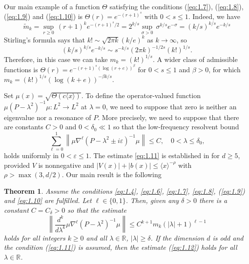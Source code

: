 \documentclass[11pt]{amsart}
\newtheorem{Theorem}{Theorem}[section]
\numberwithin{equation}{section}
\def\R{{\mathbb R}}
\begin{document}
Our main example of a function $\Theta$ satisfying the conditions 
(\ref{eq:1.7}), (\ref{eq:1.8}), (\ref{eq:1.9}) and (\ref{eq:1.10}) is $\Theta(r)=e^{-(r+1)^s}$ with $0<s\le 1$. Indeed, we have
\begin{equation*}
\widetilde m_k=\sup_{r\ge 0}\,(r+1)^{k}e^{-(r+1)^s/2}=2^{k/s}\sup_{\sigma>0}\,\sigma^{k/s}e^{-\sigma}
 = (k/s)^{k/s} e^{-k/s} 
\end{equation*}
 Stirling's formula says that $k! \sim \sqrt{2 \pi k } (k/e)^k$ as $k \to \infty$, so 
\begin{equation*}
(k/s)^{k/s} e^{-k/s} \sim s^{-k/s} (2\pi k)^{-1/2s} (k!)^{1/s}.
\end{equation*}
Therefore, in this case we can take $m_k=(k!)^{1/s}$. A wider class of admissible functions is $\Theta(r) = e^{-(r +1)^s(\log(r + e))^\beta}$ for $0 < s \le 1$ and $\beta > 0$, for which $m_k = (k!)^{1/s} (\log(k +e))^{-\beta k /s}$.

Set $\mu(x)=\sqrt{\Theta(c\langle x\rangle)}$. To define the operator-valued function 
 $\mu(P-\lambda^2)^{-1}\mu:L^2\to L^2$ at $\lambda=0$, we need to suppose that zero is neither 
an eigenvalue nor a resonance of $P$.
More precisely, we need to suppose that 
there are constants $C>0$ and $0<\delta_0\ll 1$ so that 
the low-frequency resolvent bound 
\begin{equation}\label{eq:1.11}
\sum_{\ell=0}^1\left\|\mu\nabla^\ell(P-\lambda^2\pm i\varepsilon)^{-1}\mu\right\|\le C,\quad 0<\lambda\le\delta_0,
\end{equation}
holds uniformly in $0<\varepsilon\le 1$. The estimate \eqref{eq:1.11} is established in \cite[Section 5]{kn:LSV} for $d\ge 5$, provided $V$ is nonnegative and $|V(x)| + |b(x)| \le \langle x \rangle^{-\rho}$ with $\rho > \max(3, d/2)$. Our main result is the following

\begin{Theorem} \label{1.1}
Assume the conditions \eqref{eq:1.4}, \eqref{eq:1.6}, \eqref{eq:1.7}, \eqref{eq:1.8}, (\ref{eq:1.9}) and \eqref{eq:1.10} are fulfilled. 
Let $\ell\in\{0,1\}$. Then, given any $\delta>0$ there is a constant $C=C_\delta>0$ so that the estimate 
\begin{equation}\label{eq:1.12}
\left\|\frac{d^k}{d\lambda^k}\mu\nabla^{\ell}(P-\lambda^2)^{-1}\mu\right\|\le C^{k+1}m_k(|\lambda|+1)^{\ell-1}
\end{equation}
holds for all integers $k\ge 0$ and all $\lambda\in\R$, $|\lambda|\ge\delta$. 
 If the dimension $d$ is odd and the condition
 (\ref{eq:1.11}) is assumed, then the estimate (\ref{eq:1.12}) holds for all $\lambda\in\R$.
 \end{Theorem}
\end{document}
